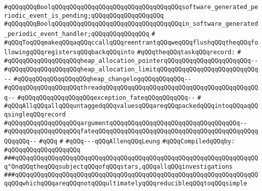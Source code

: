 \verb|#qQQqqQQqBoolqQQqqQQqqQQqqQQqqQQqqQQqqQQqqQQqqQQqsoftware_generated_periodic_event_is_pending;qQQqqQQqqQQqqQQqqQQq|\newline
\verb|#qQQqqQQqBoolqQQqqQQqqQQqqQQqqQQqqQQqqQQqqQQqqQQqin_software_generated_periodic_event_handler;qQQqqQQqqQQqqQQq|\newline
\verb|#|\newline
\verb|#qQQqToqQQqmakeqQQqaqQQqccallqQQqreentrantqQQqweqQQqflushqQQqtheqQQqfollowingqQQqregistersqQQqbackqQQqinto|\newline
\verb|#qQQqtheqQQqtaskqQQqrecord:|\newline
\verb|#|\newline
\verb|#qQQqqQQqqQQqqQQqqQQqheap_allocation_pointerqQQqqQQqqQQqqQQqqQQqqQQq--|\newline
\verb|#qQQqqQQqqQQqqQQqqQQqheap_allocation_limitqQQqqQQqqQQqqQQqqQQqqQQqqQQq--|\newline
\verb|#qQQqqQQqqQQqqQQqqQQqheap_changelogqQQqqQQqqQQq--|\newline
\verb|#qQQqqQQqqQQqqQQqqQQqthreadqQQqqQQqqQQqqQQqqQQqqQQqqQQqqQQqqQQqqQQqqQQq--|\newline
\verb|#qQQqqQQqqQQqqQQqqQQqexception_fateqQQqqQQqqQQq--|\newline
\verb|#|\newline
\verb|#qQQqAllqQQqallqQQquntaggedqQQqvaluesqQQqareqQQqpackedqQQqintoqQQqaqQQqsingleqQQqrecord|\newline
\verb|#qQQqqQQqqQQqqQQqqQQqargumentqQQqqQQqqQQqqQQqqQQqqQQqqQQqqQQqqQQq--|\newline
\verb|#qQQqqQQqqQQqqQQqqQQqfateqQQqqQQqqQQqqQQqqQQqqQQqqQQqqQQqqQQqqQQqqQQqqQQqqQQq--|\newline
\verb|#qQQq|\newline
\verb|#|\newline
\verb|#qQQq---qQQqAllenqQQqLeung|\newline
\newline
\verb|#qQQqCompiledqQQqby:|\newline
\verb|#qQQqqQQqqQQqqQQqqQQq|\newline
\newline
\newline
\verb|###qQQqqQQqqQQqqQQqqQQqqQQqqQQqqQQqqQQqqQQqqQQqqQQqqQQqqQQqqQQqqQQqqQQq"OnqQQqtheqQQqsubjectqQQqofqQQqstars,qQQqallqQQqinvestigations|\newline
\verb|###qQQqqQQqqQQqqQQqqQQqqQQqqQQqqQQqqQQqqQQqqQQqqQQqqQQqqQQqqQQqqQQqqQQqqQQqwhichqQQqareqQQqnotqQQqultimatelyqQQqreducibleqQQqtoqQQqsimple|\newline
